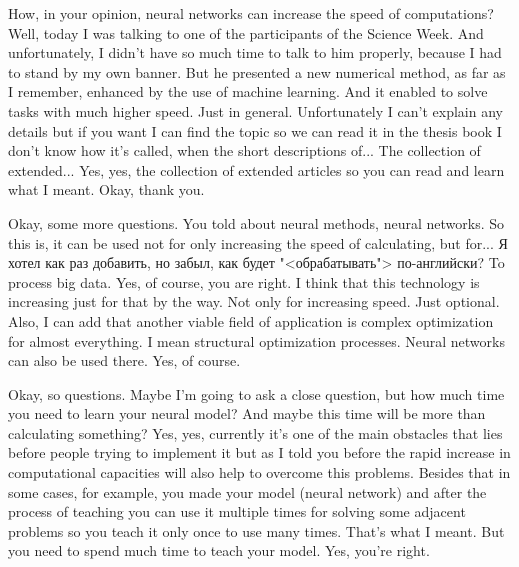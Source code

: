 \documentclass[main.tex]{subfiles}
\begin{document}
How, in your opinion, neural networks can increase the speed of computations?
Well, today I was talking to one of the participants of the Science Week.
And unfortunately, I didn't have so much time to talk to him properly, because I had to stand by my own banner.
But he presented a new numerical method, as far as I remember, enhanced by the use of machine learning.
And it enabled to solve tasks with much higher speed.
Just in general.
Unfortunately I can't explain any details but if you want I can find the topic so we can read it in the thesis book I don't know how it's called, when the short descriptions of...
The collection of extended...
Yes, yes, the collection of extended articles so you can read and learn what I meant.
Okay, thank you.

Okay, some more questions.
You told about neural methods, neural networks.
So this is, it can be used not for only increasing the speed of calculating, but for...
Я хотел как раз добавить, но забыл, как будет "<обрабатывать"> по-английски?
To process big data.
Yes, of course, you are right.
I think that this technology is increasing just for that by the way.
Not only for increasing speed.
Just optional.
Also, I can add that another viable field of application is complex optimization for almost everything.
I mean structural optimization processes.
Neural networks can also be used there.
Yes, of course.

Okay, so questions.
Maybe I'm going to ask a close question, but how much time you need to learn your neural model?
And maybe this time will be more than calculating something?
Yes, yes, currently it's one of the main obstacles that lies before people trying to implement it but as I told you before the rapid increase in computational capacities will also help to overcome this problems.
Besides that in some cases, for example, you made your model (neural network) and after the process of teaching you can use it multiple times for solving some adjacent problems so you teach it only once to use many times.
That's what I meant.
But you need to spend much time to teach your model.
Yes, you're right.
\end{document}
